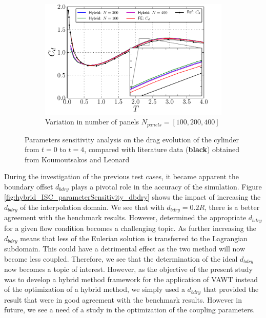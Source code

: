 \begin{figure}[!p]
     ~
     \begin{subfigure}[b]{0.7\textwidth}
             \includegraphics[width=\textwidth]{./figures/validation/isc/hybrid_ISC_drag_nPanel2.pdf}
             \caption{Variation in number of panels $N_{panels} = [100,200,400]$}
             \label{fig:hybrid_ISC_drag_nPanelComparison}
	 \end{subfigure}
    
     \caption{Parameters sensitivity analysis on the drag evolution of the cylinder from $t=0$ to $t=4$, compared with literature data (\textbf{black}) obtained from Koumoutsakos and Leonard \cite{Koumoutsakos1995a}}
     \label{fig:hybrid_ISC_parameterSensitivity}
	\end{figure}
	



During the investigation of the previous test cases, it became apparent the boundary offset $d_{bdry}$ plays a pivotal role in the accuracy of the simulation. Figure \ref{fig:hybrid_ISC_parameterSensitivity_dbdry} shows the impact of increasing the $d_{bdry}$ of the interpolation domain. We see that with $d_{bdry}=0.2R$, there is a better agreement with the benchmark results. However, determined the appropriate $d_{bdry}$ for a given flow condition becomes a challenging topic. As further increasing the $d_{bdry}$ means that less of the Eulerian solution is transferred to the Lagrangian subdomain. This could have a detrimental effect as the two method will now become less coupled. Therefore, we see that the determination of the ideal $d_{bdry}$ now becomes a topic of interest. However, as the objective of the  present study was to develop a hybrid method framework for the application of VAWT instead of the optimization of a hybrid method, we simply used a $d_{bdry}$ that provided the result that were in good agreement with the benchmark results. However in future, we see a need of a study in the optimization of the coupling parameters.


